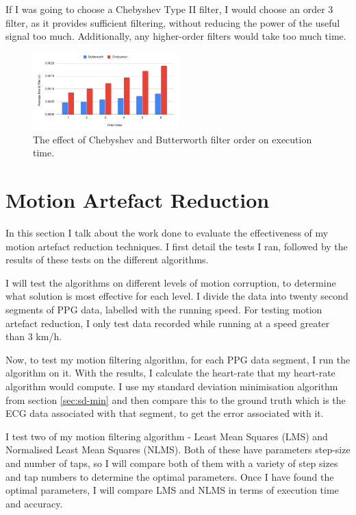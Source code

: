 \documentclass[12pt,a4paper,twoside,openany]{report}
\begin{document}
If I was going to choose a Chebyshev Type II filter, I would choose an order 3
filter, as it provides sufficient filtering, without reducing the power of the
useful signal too much. Additionally, any higher-order filters would take too
much time.

\begin{figure}[tbh]
	\centerline{\includegraphics[width=0.5\textwidth]{figs/cheby2andbutter-time.png}}
	\caption{The effect of Chebyshev and Butterworth filter order on execution time.}
	\label{fig:cheby2-time}
\end{figure}


\section{Motion Artefact Reduction}

In this section I talk about the work done to evaluate the effectiveness of my
motion artefact reduction techniques. 
I first detail the tests I
ran, followed by the results of these tests on the different algorithms.

I will test the algorithms on different levels of motion corruption, to
determine what solution is most effective for each level. I divide the
data into twenty second segments of PPG data, labelled with the running speed. For
testing motion artefact reduction, I only test data recorded while running at
a speed greater than 3 km/h.

Now, to test my motion filtering algorithm, for each PPG data segment, I run
the algorithm on it. With the results, I calculate the heart-rate that my
heart-rate algorithm would compute. 
I use my standard deviation minimisation algorithm from section \ref{sec:sd-min}
and then compare this to the
ground truth which is the ECG data associated with that segment, to get the
error associated with it.

I test two of my motion filtering algorithm - Least Mean Squares (LMS) and Normalised Least Mean
Squares (NLMS). Both of these have parameters step-size and number of taps, so I will
compare both of them with a variety of step sizes and tap numbers to determine
the optimal parameters. Once I have found the optimal parameters, I will
compare LMS and NLMS in terms of execution time and accuracy.
\end{document}
